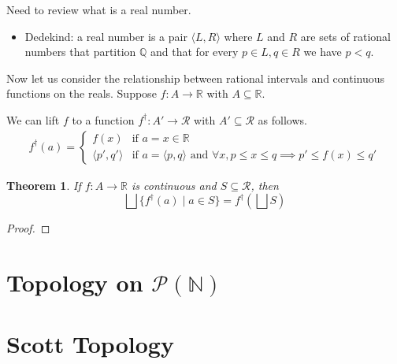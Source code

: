 \documentclass{article}
\newtheorem{theorem}{Theorem}%
\newcommand{\Reals}[0]{\mathbb{R}}
\newcommand{\Rats}[0]{\mathbb{Q}}
\begin{document}
Need to review what is a real number.
\begin{itemize}
\item Dedekind: a real number is a pair $\langle L, R \rangle$
  where $L$ and $R$ are sets of rational numbers that partition
  $\Rats$ and that for every $p \in L, q \in R$ we have $p < q$.
\end{itemize}



Now let us consider the relationship between rational intervals and
continuous functions on the reals. Suppose $f : A \to \Reals$ with $A
\subseteq \Reals$. 

We can lift $f$ to a function $f^\dagger : A' \to \mathcal{R}$ with
$A' \subseteq \mathcal{R}$ as follows.
\begin{align*}
  f^\dagger(a) = 
  \begin{cases}
    f(x) & \text{if } a=x \in \Reals \\
    \langle p',q' \rangle & \text{if } a = \langle p,q \rangle \text{ and }
         \forall x, p \leq x \leq q \implies p' \leq f(x) \leq q'
  \end{cases}
\end{align*}



\begin{theorem}
  If $f : A \to \Reals$ is continuous and $S \subseteq \mathcal{R}$, 
  then 
  \[
  \bigsqcup \{ f^\dagger(a) \mid a \in S \} = f^\dagger\left(\bigsqcup S\right)
  \]
\end{theorem}
\begin{proof}

\end{proof}


\section{Topology on $\mathcal{P}(\mathbb{N})$}



\section{Scott Topology}
\end{document}
